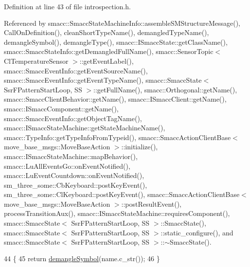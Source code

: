 Definition at line 43 of file introspection.\+h.



Referenced by smacc\+::\+Smacc\+State\+Machine\+Info\+::assemble\+S\+M\+Structure\+Message(), Call\+On\+Definition(), clean\+Short\+Type\+Name(), demangled\+Type\+Name(), demangle\+Symbol(), demangle\+Type(), smacc\+::\+I\+Smacc\+State\+::get\+Class\+Name(), smacc\+::\+Smacc\+State\+Info\+::get\+Demangled\+Full\+Name(), smacc\+::\+Sensor\+Topic$<$ Cl\+Temperature\+Sensor $>$\+::get\+Event\+Label(), smacc\+::\+Smacc\+Event\+Info\+::get\+Event\+Source\+Name(), smacc\+::\+Smacc\+Event\+Info\+::get\+Event\+Type\+Name(), smacc\+::\+Smacc\+State$<$ Ssr\+F\+Pattern\+Start\+Loop, S\+S $>$\+::get\+Full\+Name(), smacc\+::\+Orthogonal\+::get\+Name(), smacc\+::\+Smacc\+Client\+Behavior\+::get\+Name(), smacc\+::\+I\+Smacc\+Client\+::get\+Name(), smacc\+::\+I\+Smacc\+Component\+::get\+Name(), smacc\+::\+Smacc\+Event\+Info\+::get\+Object\+Tag\+Name(), smacc\+::\+I\+Smacc\+State\+Machine\+::get\+State\+Machine\+Name(), smacc\+::\+Type\+Info\+::get\+Type\+Info\+From\+Typeid(), smacc\+::\+Smacc\+Action\+Client\+Base$<$ move\+\_\+base\+\_\+msgs\+::\+Move\+Base\+Action $>$\+::initialize(), smacc\+::\+I\+Smacc\+State\+Machine\+::map\+Behavior(), smacc\+::\+Lu\+All\+Events\+Go\+::on\+Event\+Notified(), smacc\+::\+Lu\+Event\+Countdown\+::on\+Event\+Notified(), sm\+\_\+three\+\_\+some\+::\+Cb\+Keyboard\+::post\+Key\+Event(), sm\+\_\+three\+\_\+some\+::\+Cl\+Keyboard\+::post\+Key\+Event(), smacc\+::\+Smacc\+Action\+Client\+Base$<$ move\+\_\+base\+\_\+msgs\+::\+Move\+Base\+Action $>$\+::post\+Result\+Event(), process\+Transition\+Aux(), smacc\+::\+I\+Smacc\+State\+Machine\+::requires\+Component(), smacc\+::\+Smacc\+State$<$ Ssr\+F\+Pattern\+Start\+Loop, S\+S $>$\+::\+Smacc\+State(), smacc\+::\+Smacc\+State$<$ Ssr\+F\+Pattern\+Start\+Loop, S\+S $>$\+::static\+\_\+configure(), and smacc\+::\+Smacc\+State$<$ Ssr\+F\+Pattern\+Start\+Loop, S\+S $>$\+::$\sim$\+Smacc\+State().


\begin{DoxyCode}
44 \{
45     \textcolor{keywordflow}{return} \hyperlink{namespacesmacc_a4dd421d5d4e7617fcf4a9a756797adda}{demangleSymbol}(name.c\_str());
46 \}
\end{DoxyCode}


